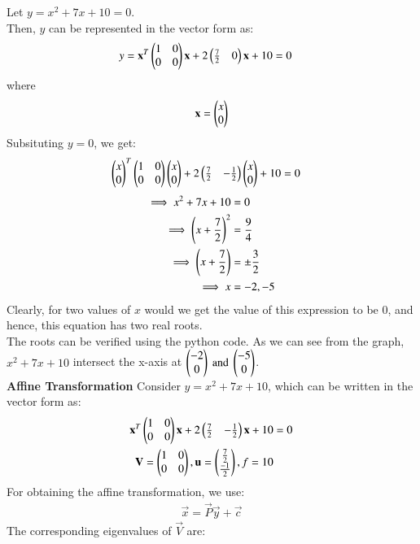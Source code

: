 \documentclass[journal,12pt,twocolumn]{IEEEtran}
\begin{document}
Let $y = x^2+7x+10 = 0$. \\Then, $y$ can be represented in the vector form as:
\begin{align}
     y = \mathbf{x}^T\begin{pmatrix}1 & 0 \\ 0 & 0\end{pmatrix}\mathbf{x} + 2\begin{pmatrix}\frac{7}{2} & 0\end{pmatrix}\mathbf{x} + 10 &= 0\label{eq:2}
\end{align}
where 
\begin{align}
    \mathbf{x} = \begin{pmatrix}x\\0\end{pmatrix}
\end{align}
Subsituting $y = 0$, we get:
\begin{align}
     \begin{pmatrix}x \\ 0\end{pmatrix}^T\begin{pmatrix}1 & 0 \\ 0 & 0\end{pmatrix}\begin{pmatrix}x \\ 0\end{pmatrix} + 2\begin{pmatrix}\frac{7}{2} & -\frac{1}{2}\end{pmatrix}\begin{pmatrix}x \\ 0\end{pmatrix} + 10 &= 0
\end{align}
\begin{align}
    \implies x^2 + 7x + 10 &= 0\\
    \implies \left(x + \frac{7}{2}\right)^2 &= \frac{9}{4}\\
    \implies \left(x + \frac{7}{2}\right) &= \pm\frac{3}{2}\label{eq:4}\\
    \implies x  &= -2,-5\label{eq:5}
\end{align}
Clearly, for two values of $x$ would we get the value of this expression to be $0$, and hence, this equation has two real roots.\\
The roots can be verified using the python code. As we can see from the graph, $x^2+7x+10$ intersect the x-axis at ${\begin{pmatrix}-2\\0\end{pmatrix}\text{ and }\begin{pmatrix}-5\\0\end{pmatrix}}$.\\
\textbf{Affine Transformation}
Consider $y = x^2+7x+10$, which can be written in the vector form as:
\begin{align}
\mathbf{x}^T\begin{pmatrix}1 & 0 \\ 0 & 0\end{pmatrix}\mathbf{x} + 2\begin{pmatrix}\frac{7}{2} & -\frac{1}{2}\end{pmatrix}\mathbf{x} + 10 &= 0 \\
\mathbf{V} = \begin{pmatrix}1 & 0\\0 & 0\end{pmatrix} , \mathbf{u} = \begin{pmatrix}\frac{7}{2}\\ \frac{-1}{2}\end{pmatrix} , f = 10
\end{align}
For obtaining the affine transformation, we use:
\begin{align}
    \vec{x} = \vec{P}\vec{y} + \vec{c}
\end{align}
The corresponding eigenvalues of $\vec{V}$ are:
\end{document}
